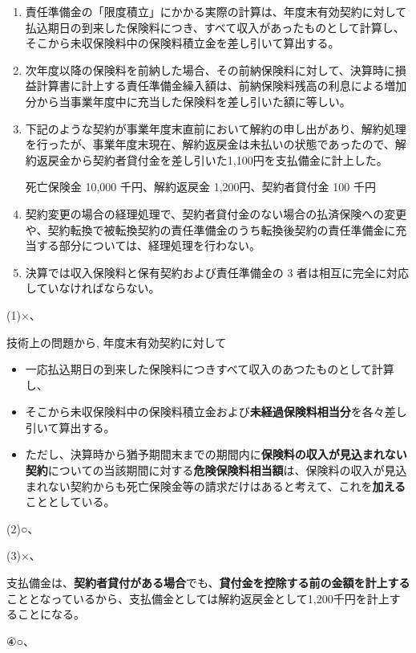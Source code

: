 \documentclass[report,gutter=10mm,fore-edge=10mm,uplatex,dvipdfmx]{jlreq}
\begin{document}
\begin{enumerate} [(1)]
\item 責任準備金の「限度積立」にかかる実際の計算は、年度末有効契約に対して払込期日の到来した保険料につき、すべて収入があったものとして計算し、そこから未収保険料中の保険料積立金を差し引いて算出する。
\item 次年度以降の保険料を前納した場合、その前納保険料に対して、決算時に損益計算書に計上する責任準備金繰入額は、前納保険料残高の利息による増加分から当事業年度中に充当した保険料を差し引いた額に等しい。
\item 下記のような契約が事業年度末直前において解約の申し出があり、解約処理を行ったが、事業年度末現在、解約返戻金は未払いの状態であったので、解約返戻金から契約者貸付金を差し引いた1,100円を支払備金に計上した。 

死亡保険金 10,000 千円、解約返戻金 1,200円、契約者貸付金 100 千円
\item 契約変更の場合の経理処理で、契約者貸付金のない場合の払済保険への変更や、契約転換で被転換契約の責任準備金のうち転換後契約の責任準備金に充当する部分については、経理処理を行わない。
\item 決算では収入保険料と保有契約および責任準備金の 3 者は相互に完全に対応していなければならない。
\end{enumerate}


(1)×、

 技術上の問題から, 年度末有効契約に対して

\begin{itemize}
\tightlist
\item
  一応払込期日の到来した保険料につきすべて収入のあつたものとして計算し、
\item
  そこから未収保険料中の保険料積立金および\textbf{未経過保険料相当分}を各々差し引いて算出する。
\item
  ただし、決算時から猶予期間末までの期間内に\textbf{保険料の収入が見込まれない契約}についての当該期間に対する\textbf{危険保険料相当額}は、保険料の収入が見込まれない契約からも死亡保険金等の請求だけはあると考えて、これを\textbf{加える}こととしている。
\end{itemize}

(2)○、 

(3)×、

支払備金は、\textbf{契約者貸付がある場合}でも、\textbf{貸付金を控除する前の金額を計上する}こととなっているから、支払備金としては解約返戻金として1,200千円を計上することになる。

④○、 
\end{document}
